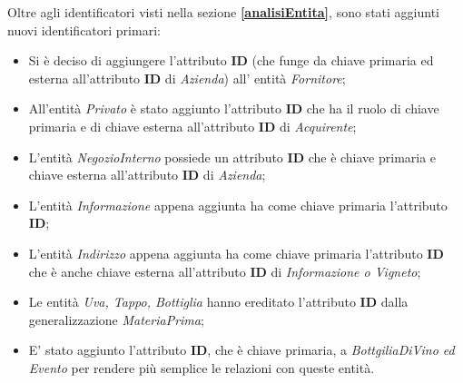 Oltre agli identificatori visti nella sezione \textbf{\ref{analisiEntita}}, sono stati aggiunti nuovi identificatori primari:

\begin{itemize}
	\item Si è deciso di aggiungere l'attributo \textbf{ID} (che funge da chiave primaria ed esterna all'attributo \textbf{ID} di \emph{Azienda}) all' entità \emph{Fornitore};
	\item All'entità \emph{Privato} è stato aggiunto l'attributo \textbf{ID} che ha il ruolo di chiave primaria e di chiave esterna all'attributo \textbf{ID} di \emph{Acquirente};
	\item L'entità \emph{NegozioInterno} possiede un attributo \textbf{ID} che è chiave primaria e chiave esterna all'attributo \textbf{ID} di \emph{Azienda};
	\item L'entità \emph{Informazione} appena aggiunta ha come chiave primaria l'attributo \textbf{ID};
	\item L'entità \emph{Indirizzo} appena aggiunta ha come chiave primaria l'attributo \textbf{ID} che è anche chiave esterna all'attributo \textbf{ID} di \emph{Informazione o Vigneto};
	\item Le entità \emph{Uva, Tappo, Bottiglia} hanno ereditato l'attributo \textbf{ID} dalla generalizzazione \emph{MateriaPrima};
	\item E' stato aggiunto l'attributo \textbf{ID}, che è chiave primaria, a \emph{BottgiliaDiVino ed Evento} per rendere più semplice le relazioni con queste entità.
\end{itemize}